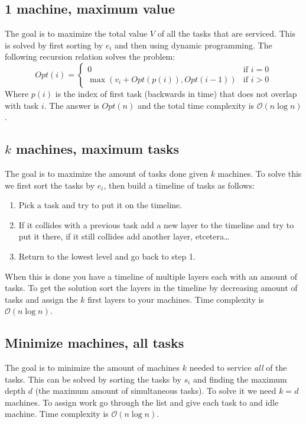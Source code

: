 \documentclass[8pt,a4paper,landscape,oneside]{amsart}
\newcommand{\bigO}{\mathcal{O}}
\begin{document}
\begin{multicols*}{3}
  \subsection{1 machine, maximum value}
  The goal is to maximize the total value $V$ of all the tasks that are serviced. This is solved by first sorting by $e_i$ and then using dynamic programming. The following recursion relation solves the problem:
  \[
  Opt(i) = \begin{cases}
  0 & \text{if } i = 0 \\
  \max(v_i + Opt(p(i)), Opt(i-1)) & \text{if } i > 0
  \end{cases}
  \]
  Where $p(i)$ is the index of first task (backwards in time) that does not overlap with task $i$. The answer is $Opt(n)$ and the total time complexity is $\bigO(n\log n)$.
  
  \subsection{$k$ machines, maximum tasks}
  The goal is to maximize the amount of tasks done given $k$ machines. To solve this we first sort the tasks by $e_i$, then build a timeline of tasks as follows:
  \begin{enumerate}
    \item Pick a task and try to put it on the timeline.
    \item If it collides with a previous task add a new layer to the timeline and try to put it there, if it still collides add another layer, etcetera\ldots
    \item Return to the lowest level and go back to step 1.
  \end{enumerate}
  When this is done you have a timeline of multiple layers each with an amount of tasks. To get the solution sort the layers in the timeline by decreasing amount of tasks and assign the $k$ first layers to your machines. Time complexity is $\bigO(n\log n)$.
  
  \subsection{Minimize machines, all tasks}
  The goal is to minimize the amount of machines $k$ needed to service \emph{all} of the tasks. This can be solved by sorting the tasks by $s_i$ and finding the maximum depth $d$ (the maximum amount of simultaneous tasks). To solve it we need $k=d$ machines. To assign work go through the list and give each task to and idle machine.  Time complexity is $\bigO(n\log n)$.
        

\end{multicols*}
\end{document}
